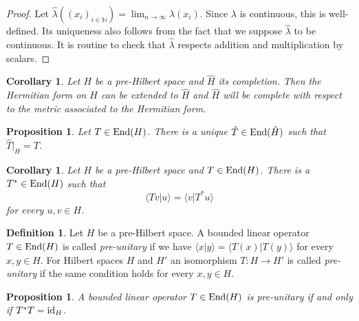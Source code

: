 \documentclass[12pt]{article}
\newtheorem{prop}[theorem]{Proposition}
\newtheorem{corollary}[theorem]{Corollary}
\theoremstyle{definition}
\newtheorem{dfn}[theorem]{Definition}
\theoremstyle{remark}
\newcommand{\End}[1]{\textup{End}(#1)}
\begin{document}
    \begin{proof}
        Let $\hat \lambda((x_i)_{i\in\mathbb{N}})=\lim_{n\to\infty}\lambda(x_i)$. Since $\lambda$ is continuous, this is well-defined. Its uniqueness also follows from the fact that we suppose $\hat \lambda$ to be continuous. It is routine to check that $\hat \lambda$ respects addition and multiplication by scalars.
    \end{proof}

    \begin{corollary}
        Let $H$ be a pre-Hilbert space and $\hat{H}$ its completion. Then the Hermitian form on $H$ can be extended to $\hat{H}$ and $\hat{H}$ will be complete with respect to the metric associated to the Hermitian form.
    \end{corollary}

    \begin{prop}
        Let $T\in\End{H}$. There is a unique $\hat T\in\End{\hat H}$ such that $\hat T|_H = T$.
    \end{prop}

    \begin{corollary}
        Let $H$ be a pre-Hilbert space and $T\in\End{H}$. There is a $T^*\in\End{H}$ such that
        $$
        \langle Tv|u \rangle = \langle v|T^*u \rangle
        $$
        for every $u,v\in H$.
    \end{corollary}

    \begin{dfn}
        Let $H$ be a pre-Hilbert space. A bounded linear operator $T\in\End{H}$ is called \emph{pre-unitary} if we have
        $\langle x|y \rangle = \langle T(x)|T(y) \rangle$
        for every $x,y\in H$. For Hilbert spaces $H$ and $H'$ an isomorphism $T\colon H\to H'$ is called \emph{pre-unitary} if the same condition holds for every $x,y\in H$. 
    \end{dfn}

    \begin{prop}
        A bounded linear operator $T\in\End{H}$ is pre-unitary if and only if $T^*T=\textup{id}_H$.
    \end{prop}
\end{document}
